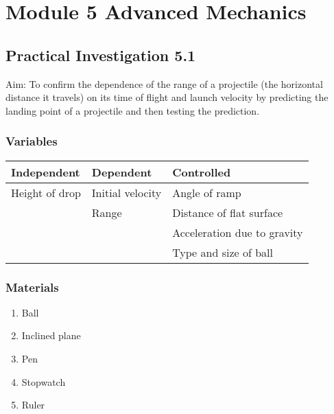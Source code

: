 
\chapter{Module 5 \hspace{0.5em} Advanced Mechanics}

\section{Practical Investigation 5.1}
	Aim: To confirm the dependence of the range of a projectile (the horizontal distance it travels) on its time of flight and launch velocity by predicting the landing point of a projectile and then testing the prediction.

	\subsection{Variables}
	\begin{table}[htbp]
		\centering
		\begin{tabular}{l|l|l}
			Independent & Dependent & Controlled \\ \hline
			Height of drop 	& Initial velocity 	& Angle of ramp \\
			 				& Range 			& Distance of flat surface \\
			 				& 					& Acceleration due to gravity \\
			 				& 					& Type and size of ball \\ 
		\end{tabular}
	\end{table}

	\subsection{Materials}
	\begin{enumerate}
		\item Ball
		\item Inclined plane
		\item Pen
		\item Stopwatch
		\item Ruler
	\end{enumerate}

